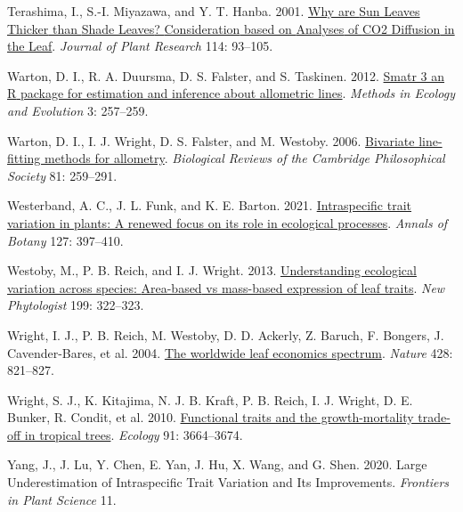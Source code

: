 \documentclass[
  12pt,
  a4paper,
,tablecaptionabove
]{scrartcl}
\newlength{\cslhangindent}
\newenvironment{CSLReferences}[2] %
 {%
  \setlength{\parindent}{0pt}
  \ifodd #1 \everypar{\setlength{\hangindent}{\cslhangindent}}\ignorespaces\fi
  \ifnum #2 > 0
  \setlength{\parskip}{#2\baselineskip}
  \fi
 }%
 {}
\begin{document}
\begin{CSLReferences}{1}{0}
\leavevmode{}%
Terashima, I., S.-I. Miyazawa, and Y. T. Hanba. 2001. \href{https://doi.org/10.1007/PL00013972}{Why are {Sun Leaves Thicker} than {Shade Leaves}? \textemdash{} {Consideration} based on {Analyses} of {CO2 Diffusion} in the {Leaf}}. \emph{Journal of Plant Research} 114: 93--105.

\leavevmode{}%
Warton, D. I., R. A. Duursma, D. S. Falster, and S. Taskinen. 2012. \href{https://doi.org/10.1111/j.2041-210X.2011.00153.x}{Smatr 3\textendash{} an {R} package for estimation and inference about allometric lines}. \emph{Methods in Ecology and Evolution} 3: 257--259.

\leavevmode{}%
Warton, D. I., I. J. Wright, D. S. Falster, and M. Westoby. 2006. \href{https://doi.org/10.1017/S1464793106007007}{Bivariate line-fitting methods for allometry}. \emph{Biological Reviews of the Cambridge Philosophical Society} 81: 259--291.

\leavevmode{}%
Westerband, A. C., J. L. Funk, and K. E. Barton. 2021. \href{https://doi.org/10.1093/aob/mcab011}{Intraspecific trait variation in plants: A renewed focus on its role in ecological processes}. \emph{Annals of Botany} 127: 397--410.

\leavevmode{}%
Westoby, M., P. B. Reich, and I. J. Wright. 2013. \href{https://doi.org/10.1111/nph.12345}{Understanding ecological variation across species: {Area-based} vs mass-based expression of leaf traits}. \emph{New Phytologist} 199: 322--323.

\leavevmode{}%
Wright, I. J., P. B. Reich, M. Westoby, D. D. Ackerly, Z. Baruch, F. Bongers, J. Cavender-Bares, et al. 2004. \href{https://doi.org/10.1038/nature02403}{The worldwide leaf economics spectrum}. \emph{Nature} 428: 821--827.

\leavevmode{}%
Wright, S. J., K. Kitajima, N. J. B. Kraft, P. B. Reich, I. J. Wright, D. E. Bunker, R. Condit, et al. 2010. \href{https://doi.org/10.1890/09-2335.1}{Functional traits and the growth-mortality trade-off in tropical trees}. \emph{Ecology} 91: 3664--3674.

\leavevmode{}%
Yang, J., J. Lu, Y. Chen, E. Yan, J. Hu, X. Wang, and G. Shen. 2020. Large {Underestimation} of {Intraspecific Trait Variation} and {Its Improvements}. \emph{Frontiers in Plant Science} 11.

\end{CSLReferences}
\end{document}
